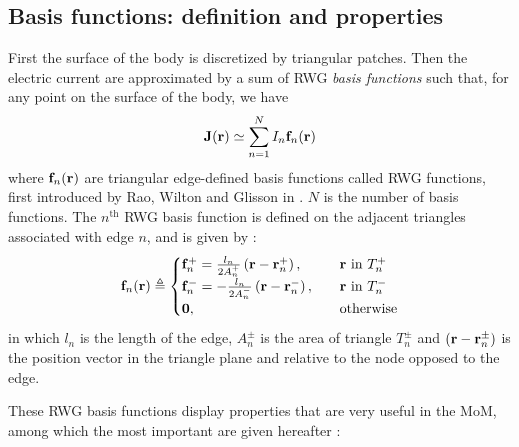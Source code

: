 \subsection{Basis functions: definition and properties}
\label{subsubsec:Basis functions: definition and properties}
%
\par
First the surface of the body is discretized by triangular patches. Then the electric current are approximated by a sum of RWG \emph{basis functions} such that, for any point on the surface of the body, we have
\begin{equation}\label{eqn:current_decomposition}
\mathbf{J}\!\left(\mathbf{r}\right) \simeq \sum_{n = 1}^{N} I_n \mathbf{f}_n \!\left(\mathbf{r}\right)
\end{equation}
where $\mathbf{f}_n \!\left(\mathbf{r}\right)$ are triangular edge-defined basis functions called RWG functions, first introduced by Rao, Wilton and Glisson in \cite{Rao_82}. $N$ is the number of basis functions. The $n^\text{th}$ RWG basis function is defined on the adjacent triangles associated with edge $n$, and is given by \cite{Michalski_90}:
\begin{equation} \label{eqn:RWG definition}
\mathbf{f}_n \!\left(\mathbf{r}\right) \triangleq
\begin{cases}
\mathbf{f}_n^+ = \frac{l_n}{2 A_n^+} \left( \mathbf{r} - \mathbf{r}_n^+\right), & \quad \text{$\mathbf{r}$ in $T_n^+$} \\
\mathbf{f}_n^- = -\frac{l_n}{2 A_n^-} \left( \mathbf{r} - \mathbf{r}_n^-\right), & \quad \text{$\mathbf{r}$ in $T_n^-$} \\
\mathbf{0}, & \quad \text{otherwise}
\end{cases}
\end{equation}
in which $l_n$ is the length of the edge, $A_n^\pm$ is the area of triangle $T_n^\pm$ and $\left( \mathbf{r} - \mathbf{r}_n^\pm\right)$ is the position vector in the triangle plane and relative to the node opposed to the edge.
%
\par
These RWG basis functions display properties that are very useful in the MoM, among which the most important are given hereafter \cite{Rao_82}:
